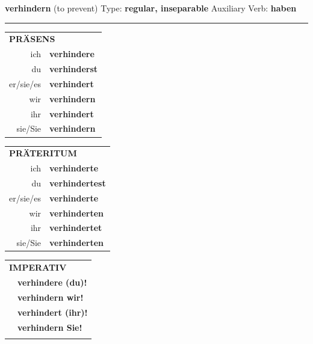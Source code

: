 \documentclass[10pt,a4paper]{revtex4-2}
\begin{document}
\begin{verbbox}
    {\Large \bf verhindern} (to prevent) \hfill Type: \textbf{regular, inseparable} \hfill Auxiliary Verb: \textbf{haben} 
    
     \vspace{5pt}

    \hrule
    
    \vspace{5pt}

  \begin{tabular}{rl}
     \multicolumn{2}{l}{\textbf{PRÄSENS} }\\
    ich & \textbf{verhindere}\\
    du & \textbf{verhinderst}\\
    er/sie/es & \textbf{verhindert}\\
    wir & \textbf{verhindern}\\
    ihr & \textbf{verhindert}\\
    sie/Sie & \textbf{verhindern}\\
  \end{tabular}
  \hfill
     \begin{tabular}{rl}
    \multicolumn{2}{l}{\textbf{PRÄTERITUM} }\\
    ich & \textbf{verhinderte}\\
    du & \textbf{verhindertest}\\
    er/sie/es & \textbf{verhinderte}\\
    wir & \textbf{verhinderten}\\
    ihr & \textbf{verhindertet}\\
    sie/Sie & \textbf{verhinderten}\\
  \end{tabular}
  \hfill
  \begin{tabular}{rl}
     \multicolumn{2}{l}{\textbf{IMPERATIV} }\\
   & \textbf{verhindere (du)!}\\
   & \textbf{verhindern wir!}\\
   & \textbf{verhindert (ihr)!}\\
   & \textbf{verhindern Sie!}\\
   & \vspace{10pt}
  \end{tabular}

    \vspace{10pt}


\end{verbbox}
\end{document}
